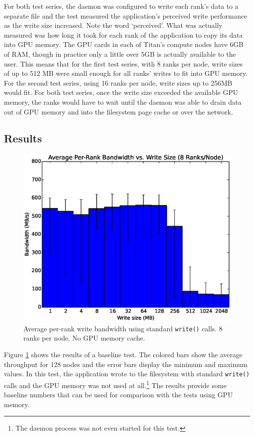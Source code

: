 For both test series, the daemon was configured to write each rank's data to a separate file and the test measured the application's perceived write performance as the write size increased.  Note the word `perceived'.  What was actually measured was how long it took for each rank of the application to copy its data into GPU memory.   The GPU cards in each of Titan's compute nodes have 6GB of RAM, though in practice only a little over 5GB is actually available to the user.  This means that for the first test series, with 8 ranks per node, write sizes of up to 512 MB were small enough for all ranks' writes to fit into GPU memory.  For the second test series, using 16 ranks per node, write sizes up to 256MB would fit.  For both test series, once the write size exceeded the available GPU memory, the ranks would have to wait until the daemon was able to drain data out of GPU memory and into the filesystem page cache or over the network.


\subsection{Results}
\label{subsec:results}

\begin{figure}
\includegraphics[width=\linewidth]{figures/figure_1.eps}
\caption{Average per-rank write bandwidth using standard \texttt{write()} calls.  8 ranks per node. No GPU memory cache.} 
\label{fig:results_base_8}
\end{figure}

Figure \ref{fig:results_base_8} shows the results of a baseline test.  The colored bars show the average throughput for 128 nodes and the error bars display the minimum and maximum values.  In this test, the application wrote to the filesystem with standard \texttt{write()} calls and the GPU memory was not used at all.\footnote{The daemon process was not even started for this test.}  The results provide some baseline numbers that can be used for comparison with the tests using GPU memory.

